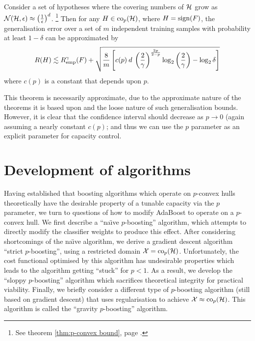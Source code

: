 \begin{theorem}
\label{thm:p convex generalisation}
Consider a set of hypotheses where the covering numbers of $\mathcal{H}$
grow as $\mathcal{N}({\mathcal{H}}, {\epsilon}) \approx \left ( \frac{1}{\epsilon}
\right) ^d$.%
\footnote{See theorem \ref{thm:p-convex bound}, page
\pageref{thm:p-convex bound}.}
Then for any $H \in \mathrm{co}_p(\mathcal{H})$, where $H = \mathrm{sign}(F)$, the
generalisation error over a set of $m$ independent training samples
with probability at least $1 - \delta$ can be approximated by 
%
\begin{equation}
R(H) \lesssim R_{\mathrm{emp}}^{\gamma}(F) + \sqrt{ \frac{8}{m} \left[ c(p) \: d \: \left( \frac{2}{\gamma} \right)^{\frac{2p}{2-p}} \log_2
\left( \frac{2}{\gamma} \right) - \log_2 \delta \right]}
\end{equation}
%
where $c(p)$ is a constant that depends upon $p$.
\end{theorem}

This theorem is necessarily approximate, due to the approximate
nature of the theorems it is based upon and the loose nature of such
generalisation bounds.  However, it is clear that the confidence
interval should decrease as $p \rightarrow 0$ (again assuming a nearly
constant $c(p)$; and thus we can use the $p$ parameter as an explicit
parameter for capacity control.


\section{Development of algorithms}

Having established that boosting algorithms which operate on
$p$-convex hulls theoretically have the desirable property of a
tunable capacity via the $p$ parameter, we turn to questions of how to
modify AdaBoost to operate on a $p$-convex hull.  We first describe a
``na\"{\i}ve $p$-boosting'' algorithm, which attempts to directly modify
the classifier weights to produce this effect.  After considering
shortcomings of the na\"{\i}ve algorithm, we derive a gradient descent
algorithm ``strict $p$-boosting'', using a restricted domain $\mathcal{X} =
\mathrm{co}_p (\mathcal{H})$.  Unfortunately, the cost functional optimised by this
algorithm has undesirable properties which leads to the algorithm
getting ``stuck'' for $p < 1$.  As a result, we develop the ``sloppy
$p$-boosting'' algorithm which sacrifices theoretical integrity for
practical viability.  Finally, we briefly consider a different type of
$p$-boosting algorithm (still based on gradient descent) that uses
regularisation to achieve $\mathcal{X} \approx \mathrm{co}_p(\mathcal{H})$.  This
algorithm is called the ``gravity $p$-boosting'' algorithm.


